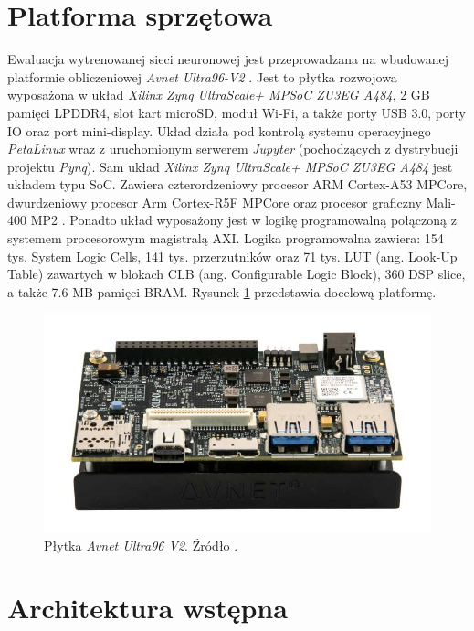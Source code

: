 \section{Platforma sprzętowa}
Ewaluacja wytrenowanej sieci neuronowej jest przeprowadzana na wbudowanej platformie obliczeniowej \emph{Avnet Ultra96-V2} \cite{avnet_ultra96}. Jest to płytka rozwojowa wyposażona w układ \emph{Xilinx Zynq UltraScale+ MPSoC ZU3EG A484}, 2 GB pamięci LPDDR4, slot kart microSD, moduł Wi-Fi, a także porty USB 3.0, porty IO oraz port mini-display. Układ działa pod kontrolą systemu operacyjnego \emph{PetaLinux} wraz z uruchomionym serwerem \emph{Jupyter} (pochodzących z dystrybucji projektu \emph{Pynq}\cite{pynq}). 
Sam układ \emph{Xilinx Zynq UltraScale+ MPSoC ZU3EG A484} jest układem typu SoC. Zawiera czterordzeniowy procesor ARM Cortex-A53 MPCore, dwurdzeniowy procesor Arm Cortex-R5F MPCore oraz procesor graficzny Mali-400 MP2 \cite{zynq_product_guide}. Ponadto układ wyposażony jest w logikę programowalną połączoną z systemem procesorowym magistralą AXI. Logika programowalna zawiera: 154 tys. System Logic Cells, 141 tys. przerzutników oraz 71 tys. LUT (ang. Look-Up Table) zawartych w blokach CLB (ang. Configurable Logic Block), 360 DSP slice, a także 7.6 MB pamięci BRAM. Rysunek \ref{fig:ultra96} przedstawia docelową platformę.

\begin{figure}
    \centering
    \includegraphics[width=\linewidth]{images/ultra96v2.png}
    \caption{Płytka \emph{Avnet Ultra96 V2}. Źródło \cite{avnet_ultra96}.}
    \label{fig:ultra96}
\end{figure}\section{Architektura wstępna}
 

